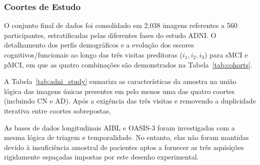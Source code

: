 \documentclass[review]{elsarticle}
\begin{document}
\subsubsection{Coortes de Estudo}\label{subsubsec:cohorts}

O conjunto final de dados foi consolidado em 2{,}038 imagens referentes a 560 participantes, estratificadas pelas diferentes fases do estudo ADNI.
O detalhamento dos perfis demográficos e a evolução dos escores cognitivos/funcionais ao longo das três visitas preditoras ($i_1, i_2, i_3$) para sMCI e pMCI, em que as quatro combinações são demonstrados na Tabela~\ref{tab:cohorts}.

A Tabela~\ref{tab:adni_study} sumariza as características da amostra na união lógica das imagens únicas presentes em pelo menos uma das quatro coortes (incluindo CN e AD). Após a exigência das três visitas e removendo a duplicidade iterativa entre coortes sobrepostas,

As bases de dados longitudinais AIBL \cite{ellis-2009} e OASIS-3 \cite{lamontagne-2019} foram investigadas com a mesma lógica de triagem e temporalidade. No entanto, elas não foram mantidas devido à insuficiência amostral de pacientes aptos a fornecer as três aquisições rigidamente espaçadas impostas por este desenho experimental.
\end{document}
